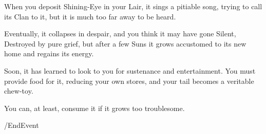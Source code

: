 When you deposit Shining-Eye in your Lair, it sings a pitiable song, trying to
call its Clan to it, but it is much too far away to be heard.

Eventually, it collapses in despair, and you think it may have gone Silent,
Destroyed by pure grief, but after a few Suns it grows accustomed to its new
home and regains its energy.

Soon, it has learned to look to you for sustenance and entertainment. You must
provide food for it, reducing your own stores, and your tail becomes a veritable
chew-toy.

You can, at least, consume it if it grows too troublesome.

\option /EndEvent
	   
